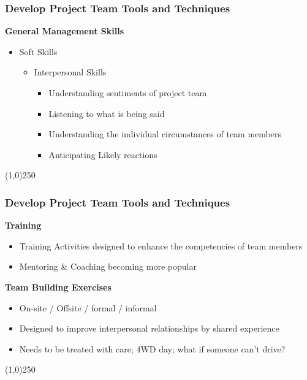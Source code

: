  
\begin{frame}
\frametitle{Develop Project Team \hfill Tools and Techniques}
\textbf{General Management Skills}
\begin{itemize}
	\item Soft Skills
 	\begin{itemize}
		\item Interpersonal Skills
			\begin{itemize}
				\item Understanding sentiments of project team
				\item Listening to what is being said
				\item Understanding the individual circumstances of team members
				\item Anticipating Likely reactions
			\end{itemize}
	\end{itemize}
\end{itemize}
\end{frame}\begin{center}\line(1,0){250}\end{center}
 
 
\begin{frame}
\frametitle{Develop Project Team \hfill Tools and Techniques}
\textbf{Training}
\begin{itemize}
	\item Training Activities designed to enhance the competencies of team members
	\item Mentoring \& Coaching becoming more popular
\end{itemize}
\textbf{Team Building Exercises}
\begin{itemize}
	\item On-site / Offsite / formal / informal
	\item Designed to improve interpersonal relationships by shared experience
	\item Needs to be treated with care; 4WD day; what if someone can't drive?
\end{itemize}
\end{frame}\begin{center}\line(1,0){250}\end{center}




